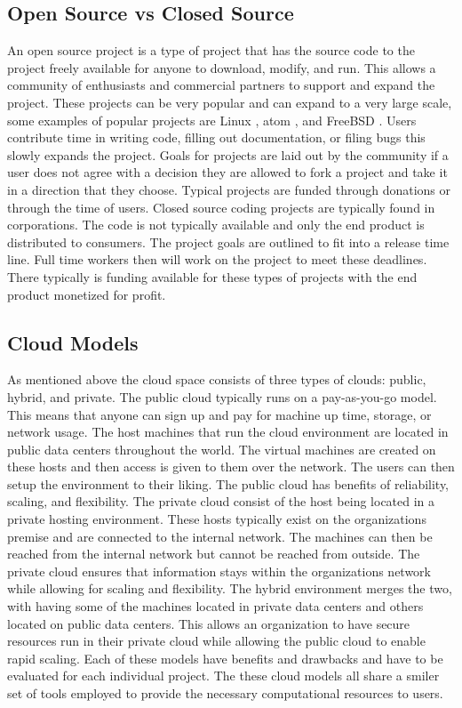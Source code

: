 \documentclass[12pt]{article}
\begin{document}
\subsection{Open Source vs Closed Source}
An open source project is a type of project that has the source code to the project freely available for anyone to download, modify, and run. This allows a community of enthusiasts and commercial partners to support and expand the project. These projects can be very popular and can expand to a very large scale, some examples of popular projects are Linux \cite{Linux}, atom \cite{atom}, and FreeBSD \cite{freebsd}. Users contribute time in writing code, filling out documentation, or filing bugs this slowly expands the project. Goals for projects are laid out by the community if a user does not agree with a decision they are allowed to fork a project and take it in a direction that they choose.  Typical projects are funded through donations or through the time of users.  Closed source coding projects are typically found in corporations. The code is not typically available and only the end product is distributed to consumers. The project goals are outlined to fit into a release time line. Full time workers then will work on the project to meet these deadlines. There typically is funding available for these types of projects with the end product monetized for profit.

\subsection{Cloud Models}
As mentioned above the cloud space consists of three types of clouds: public, hybrid, and private. The public cloud typically runs on a pay-as-you-go model. This means that anyone can sign up and pay for machine up time, storage, or network usage. The host machines that run the cloud environment are located in public data centers throughout the world. The virtual machines are created on these hosts and then access is given to them over the network. The users can then setup the environment to their liking. The public cloud has benefits of reliability, scaling, and flexibility. The private cloud consist of the host being located in a private hosting environment.  These hosts typically exist on the organizations premise and are connected to the internal network. The machines can then be reached from the internal network but cannot be reached from outside. The private cloud ensures that information stays within the organizations network while allowing for scaling and flexibility. The hybrid environment merges the two, with having some of the machines located in private data centers and others located on public data centers. This allows an organization to have secure resources run in their private cloud while allowing the public cloud to enable rapid scaling.  Each of these models have benefits and drawbacks and have to be evaluated for each individual project. The these cloud models all share a smiler set of tools employed to provide the necessary computational resources to users.
\end{document}
